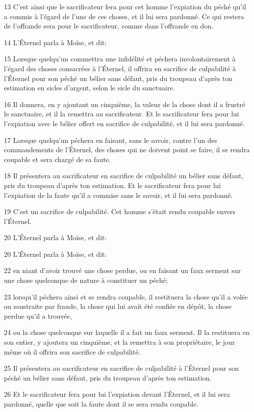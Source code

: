 \par 13 C'est ainsi que le sacrificateur fera pour cet homme l'expiation du péché qu'il a commis à l'égard de l'une de ces choses, et il lui sera pardonné. Ce qui restera de l'offrande sera pour le sacrificateur, comme dans l'offrande en don.
\par 14 L'Éternel parla à Moïse, et dit:
\par 15 Lorsque quelqu'un commettra une infidélité et péchera involontairement à l'égard des choses consacrées à l'Éternel, il offrira en sacrifice de culpabilité à l'Éternel pour son péché un bélier sans défaut, pris du troupeau d'après ton estimation en sicles d'argent, selon le sicle du sanctuaire.
\par 16 Il donnera, en y ajoutant un cinquième, la valeur de la chose dont il a frustré le sanctuaire, et il la remettra au sacrificateur. Et le sacrificateur fera pour lui l'expiation avec le bélier offert en sacrifice de culpabilité, et il lui sera pardonné.
\par 17 Lorsque quelqu'un péchera en faisant, sans le savoir, contre l'un des commandements de l'Éternel, des choses qui ne doivent point se faire, il se rendra coupable et sera chargé de sa faute.
\par 18 Il présentera au sacrificateur en sacrifice de culpabilité un bélier sans défaut, pris du troupeau d'après ton estimation. Et le sacrificateur fera pour lui l'expiation de la faute qu'il a commise sans le savoir, et il lui sera pardonné.
\par 19 C'est un sacrifice de culpabilité. Cet homme s'était rendu coupable envers l'Éternel.
\par 20 L'Éternel parla à Moïse, et dit:
\par 20 L'Éternel parla à Moïse, et dit:
\par 22 en niant d'avoir trouvé une chose perdue, ou en faisant un faux serment sur une chose quelconque de nature à constituer un péché;
\par 23 lorsqu'il péchera ainsi et se rendra coupable, il restituera la chose qu'il a volée ou soustraite par fraude, la chose qui lui avait été confiée en dépôt, la chose perdue qu'il a trouvée,
\par 24 ou la chose quelconque sur laquelle il a fait un faux serment. Il la restituera en son entier, y ajoutera un cinquième, et la remettra à son propriétaire, le jour même où il offrira son sacrifice de culpabilité.
\par 25 Il présentera au sacrificateur en sacrifice de culpabilité à l'Éternel pour son péché un bélier sans défaut, pris du troupeau d'après ton estimation.
\par 26 Et le sacrificateur fera pour lui l'expiation devant l'Éternel, et il lui sera pardonné, quelle que soit la faute dont il se sera rendu coupable.

